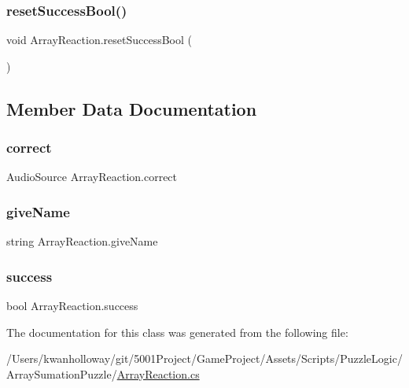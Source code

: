 \subsubsection{\texorpdfstring{reset\+Success\+Bool()}{resetSuccessBool()}}
{\footnotesize\ttfamily void Array\+Reaction.\+reset\+Success\+Bool (\begin{DoxyParamCaption}{ }\end{DoxyParamCaption})}



\subsection{Member Data Documentation}
\mbox{\label{class_array_reaction_ad469f4e03562bf0773db8ca308997a10}} 
\subsubsection{\texorpdfstring{correct}{correct}}
{\footnotesize\ttfamily Audio\+Source Array\+Reaction.\+correct}

\mbox{\label{class_array_reaction_aab057c39f78c1f0f9a2cacf8a7d23f6f}} 
\subsubsection{\texorpdfstring{give\+Name}{giveName}}
{\footnotesize\ttfamily string Array\+Reaction.\+give\+Name}

\mbox{\label{class_array_reaction_adf5df12cecfb640661571ae871e5be5d}} 
\subsubsection{\texorpdfstring{success}{success}}
{\footnotesize\ttfamily bool Array\+Reaction.\+success}



The documentation for this class was generated from the following file\+:\begin{DoxyCompactItemize}
\item 
/\+Users/kwanholloway/git/5001\+Project/\+Game\+Project/\+Assets/\+Scripts/\+Puzzle\+Logic/\+Array\+Sumation\+Puzzle/\hyperlink{_array_reaction_8cs}{Array\+Reaction.\+cs}\end{DoxyCompactItemize}
